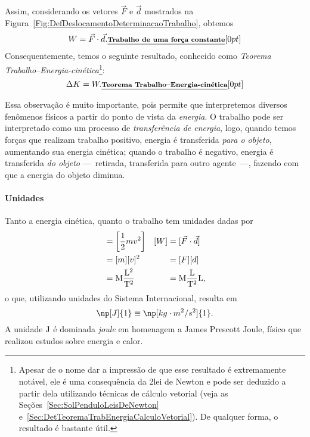 Assim, considerando os vetores $\vec{F}$ e $\vec{d}$ mostrados na Figura~\ref{Fig:DefDeslocamentoDeterminacaoTrabalho}, obtemos
\begin{equation}\label{Eq:TrabalhoForcaConstante}
  W = \vec{F}\cdot\vec{d}. \relax{\footnotesize\emph{\textbf{Trabalho de uma força constante}}}[0pt]
\end{equation}
%
Consequentemente, temos o seguinte resultado, conhecido como \emph{Teorema Trabalho--Energia-cinética}\footnote[][15mm]{Apesar de o nome dar a impressão de que esse resultado é extremamente notável, ele é uma consequência da 2\textordfeminine lei de Newton e pode ser deduzido a partir dela utilizando técnicas de cálculo vetorial (veja as Seções~\ref{Sec:SolPenduloLeisDeNewton} e~\ref{Sec:DetTeoremaTrabEnergiaCalculoVetorial}). De qualquer forma, o resultado é bastante útil.}:
\begin{equation}
  \Delta K = W. \relax{\footnotesize\emph{\textbf{Teorema Trabalho--Energia-cinética}}}[0pt]
\end{equation}

Essa observação é muito importante, pois permite que interpretemos diversos fenômenos físicos a partir do ponto de vista da \emph{energia}. O trabalho pode ser interpretado como um processo de \emph{transferência de energia}, logo, quando temos forças que realizam trabalho positivo, energia é transferida \emph{para o objeto}, aumentando sua energia cinética; quando o trabalho é negativo, energia é transferida \emph{do objeto} ---~retirada, transferida para outro agente~---, fazendo com que a energia do objeto diminua.

\paragraph{Unidades}

Tanto a energia cinética, quanto o trabalho tem unidades dadas por
\begin{align*}
    [K] &= \left[\frac{1}{2} mv^2\right] & [W] &= [\vec{F}\cdot\vec{d}] \\
    &=[m][v]^2 & &= [F][d] \\
    &=\rm{M}\frac{\rm{L}^2}{\rm{T}^2} & &= \rm{M}\frac{\rm{L}}{\rm{T}^2} \rm{L},
\end{align*}
%
o que, utilizando unidades do Sistema Internacional, resulta em
\begin{equation}
    \np[J]{1} \equiv \np[kg\cdot m^2/s^2]{1}.
\end{equation}
%
A unidade $\rm{J}$ é dominada \emph{joule} em homenagem a James Prescott Joule, físico que realizou estudos sobre energia e calor.

